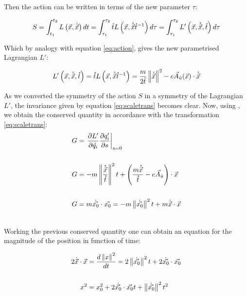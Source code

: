 Then the action can be written in terms of the new parameter $\tau$:

\begin{equation*}
S = \int_{t_1}^{t_2}L\left( \vec{x},\dot{\vec{x}} \right)dt = \int_{\tau_1}^{\tau_2}\mathring{t}L\left( \vec{x},\mathring{\vec{x}}{\mathring{t}}^{-1} \right)d\tau                                                                    = \int_{\tau_1}^{\tau_2}L'\left( \vec{x},\mathring{\vec{x}},\mathring{t} \right)d\tau
\label{eq:actiontau}
\end{equation*}

Which by analogy with equation \eqref{eq:action}, gives the new parametrised Lagrangian $L'$:

\begin{equation*}
L'\left( \vec{x},\mathring{\vec{x}},\mathring{t} \right) = \mathring{t}L\left( \vec{x},\mathring{\vec{x}}{\mathring{t}}^{-1} \right) = \frac{m}{2\mathring{t}}\left\lVert \mathring{\vec{x}} \right\rVert^2 - e\vec{A}_{\hat{u}}(\vec{x})\cdot\mathring{\vec{x}}
\end{equation*}

As we converted the symmetry of the action $S$ in a symmetry of the Lagrangian $L'$, the invariance given by  equation \eqref{eq:scaletrans} becomes clear. Now, using \cite[Thm on Integrable Systems]{scheck}, we obtain the conserved quantity in accordance with the transformation \eqref{eq:scaletrans}: \\

\begin{align*}
\nonumber
G &= \left. \frac{\partial L'}{\partial \mathring{q_i}} \frac{\partial q'_i}{\partial s} \right|_{s=0}\\ \nonumber
\\ \nonumber
G &= -m\left\lVert \frac{\mathring{\vec{x}}}{\mathring{t}} \right\rVert^2t + \left( \frac{m\mathring{\vec{x}}}{\mathring{t}} - e\vec{A}_{\hat{u}} \right)\cdot \vec{x}\\ \nonumber
\\ \nonumber
G &= m\dot{\vec{x_0}}\cdot\vec{x_0} = -m\left\lVert \dot{\vec{x_0}} \right\rVert^2t + m\dot{\vec{x}}\cdot\vec{x} \\\nonumber
\end{align*}

Working the previous conserved quantity one can obtain an equation for the magnitude of the position in function of time:

\begin{align}
\nonumber
 2\dot{\vec{x}}\cdot\vec{x} &= \frac{d\left\lVert x \right\rVert^2}{dt} = 2\left\lVert \dot{\vec{x_0}} \right\rVert^2t + 2\dot{\vec{x_0}}\cdot\vec{x_0}\\ \nonumber
 \\ 
 x^2 &= x_0^2 +2\dot{\vec{x_0}}\cdot\vec{x_0}t +\left\lVert \dot{\vec{x_0}} \right\rVert^2t^2  
 \label{eq:radius}
\end{align}

